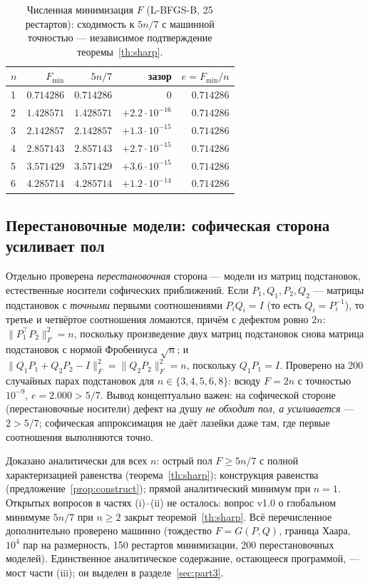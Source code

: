 \documentclass[11pt,a4paper]{article}
\theoremstyle{plain}
\theoremstyle{definition}
\theoremstyle{remark}
\begin{document}
\begin{table}[h]
\centering\small
\caption{Численная минимизация $F$ (L-BFGS-B, 25 рестартов): сходимость
к $5n/7$ с машинной точностью — независимое подтверждение
теоремы~\ref{th:sharp}.}
\label{tab:min}
\begin{tabularx}{0.9\textwidth}{l r r r r}
\toprule
$n$ & $F_{\min}$ & $5n/7$ & зазор & $e=F_{\min}/n$ \\
\midrule
\rowcolor{rowlight}
1 & $0.714286$ & $0.714286$ & $0$ & $0.714286$ \\
2 & $1.428571$ & $1.428571$ & $+2.2\cdot 10^{-16}$ & $0.714286$ \\
3 & $2.142857$ & $2.142857$ & $+1.3\cdot 10^{-15}$ & $0.714286$ \\
\rowcolor{rowlight}
4 & $2.857143$ & $2.857143$ & $+2.7\cdot 10^{-15}$ & $0.714286$ \\
5 & $3.571429$ & $3.571429$ & $+3.6\cdot 10^{-15}$ & $0.714286$ \\
6 & $4.285714$ & $4.285714$ & $+1.2\cdot 10^{-14}$ & $0.714286$ \\
\bottomrule
\end{tabularx}
\end{table}

\subsection{Перестановочные модели: софическая сторона усиливает пол}

Отдельно проверена \emph{перестановочная} сторона — модели из матриц
подстановок, естественные носители софических приближений. Если
$P_1,Q_1,P_2,Q_2$ — матрицы подстановок с \emph{точными} первыми
соотношениями $P_iQ_i=I$ (то есть $Q_i=P_i^{-1}$), то третье и четвёртое
соотношения ломаются, причём с дефектом ровно $2n$:
$\|P_1^{\top}P_2\|_F^2=n$, поскольку произведение двух матриц
подстановок снова матрица подстановок с нормой Фробениуса $\sqrt n$; и
$\|Q_1P_1+Q_2P_2-I\|_F^2=\|Q_2P_2\|_F^2=n$, поскольку $Q_1P_1=I$.
Проверено на 200 случайных парах подстановок для
$n\in\{3,4,5,6,8\}$: всюду $F=2n$ с точностью $10^{-9}$,
$e=2.000>5/7$. Вывод концептуально важен: на софической стороне
(перестановочные носители) дефект на душу \emph{не обходит пол, а
усиливается} — $2>5/7$; софическая аппроксимация не даёт лазейки даже
там, где первые соотношения выполняются точно.

\begin{honestybox}
Доказано аналитически для всех $n$: острый пол $F\ge 5n/7$ с полной
характеризацией равенства (теорема~\ref{th:sharp}); конструкция
равенства (предложение~\ref{prop:construct}); прямой аналитический
минимум при $n=1$. Открытых вопросов в частях (i)--(ii) не осталось:
вопрос v1.0 о глобальном минимуме $5n/7$ при $n\ge 2$ закрыт
теоремой~\ref{th:sharp}. Всё перечисленное дополнительно проверено
машинно (тождество $F=G(P,Q)$, граница Хаара, $10^4$ пар на
размерность, 150 рестартов минимизации, 200 перестановочных моделей).
Единственное аналитическое содержание, остающееся программой, — мост
части (iii); он выделен в разделе~\ref{sec:part3}.
\end{honestybox}
\end{document}
